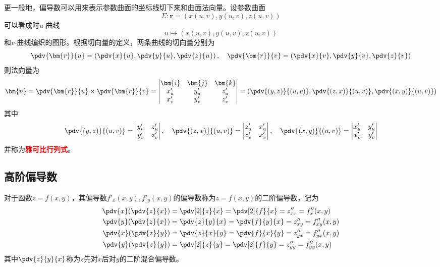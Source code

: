 更一般地，偏导数可以用来表示参数曲面的坐标线切下来和曲面法向量。设参数曲面
\[ \Sigma : \bm{r}=(x(u,v),y(u,v),z(u,v)) \]
可以看成时$u$-曲线
\[ u \mapsto (x(u,v),y(u,v),z(u,v)) \]
和$v$-曲线编织的图形。根据切向量的定义，两条曲线的切向量分别为
\[
    \pdv{\bm{r}}{u} = \left(\pdv{x}{u}, \pdv{y}{u}, \pdv{z}{u}\right)
    ,\quad
    \pdv{\bm{r}}{v} = \left(\pdv{x}{v}, \pdv{y}{v}, \pdv{z}{v}\right)
\]
则法向量为
\begin{equation}
    \bm{n} = \pdv{\bm{r}}{u} \times \pdv{\bm{r}}{v} =
    \begin{vmatrix}
        \bm{i} & \bm{j} & \bm{k} \\
        x'_u   & y'_u   & z'_u   \\
        x'_v   & y'_v   & z'_v
    \end{vmatrix}
    =
    \left(\pdv{(y,z)}{(u,v)},\pdv{(z,x)}{(u,v)}, \pdv{(x,y)}{(u,v)}\right)
\end{equation}
其中
\[
    \pdv{(y,z)}{(u,v)} =
    \begin{vmatrix}
        y'_u & z'_u \\
        y'_v & z'_v
    \end{vmatrix},\quad
    \pdv{(z,x)}{(u,v)} =
    \begin{vmatrix}
        z'_u & x'_u \\
        z'_v & x'_v
    \end{vmatrix},\quad
    \pdv{(x,y)}{(u,v)} =
    \begin{vmatrix}
        x'_u & y'_u \\
        x'_v & y'_v
    \end{vmatrix}
\]
并称为\textcolor{red}{\textbf{\textsf{雅可比行列式}}}。

\subsection{高阶偏导数}
对于函数$z=f(x,y)$，其偏导数$f'_x(x,y), f'_y(x,y)$的偏导数称为$z=f(x,y)$的二阶偏导数，记为
\begin{align*}
    \pdv{x}(\pdv{z}{x}) & = \pdv[2]{z}{x} = \pdv[2]{f}{x} = z''_{xx}=f''_x(x,y)    \\
    \pdv{y}(\pdv{z}{x}) & = \pdv{z}{y}{x} = \pdv{f}{y}{x} = z''_{xy}=f''_{xy}(x,y) \\
    \pdv{x}(\pdv{z}{y}) & = \pdv{z}{x}{y} = \pdv{f}{x}{y} = z''_{yx}=f''_{yx}(x,y) \\
    \pdv{y}(\pdv{z}{y}) & = \pdv[2]{z}{y} = \pdv[2]{f}{y} = z''_{yy}=f''_{yy}(x,y) \\
\end{align*}
其中$\displaystyle\pdv{z}{y}{x}$称为$z$先对$x$后对$y$的二阶混合偏导数。

